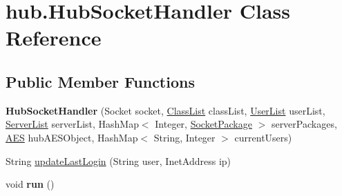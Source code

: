 \hypertarget{classhub_1_1_hub_socket_handler}{
\section{hub.\-Hub\-Socket\-Handler \-Class \-Reference}
\label{classhub_1_1_hub_socket_handler}
}
\subsection*{\-Public \-Member \-Functions}
\begin{DoxyCompactItemize}
\item 
\hypertarget{classhub_1_1_hub_socket_handler_a7895b3b80237dce5f1896317b3e14705}{
{\bfseries \-Hub\-Socket\-Handler} (\-Socket socket, \hyperlink{classstorage_1_1_class_list}{\-Class\-List} class\-List, \hyperlink{classstorage_1_1_user_list}{\-User\-List} user\-List, \hyperlink{classstorage_1_1_server_list}{\-Server\-List} server\-List, \-Hash\-Map$<$ \-Integer, \hyperlink{classutil_1_1_socket_package}{\-Socket\-Package} $>$ server\-Packages, \hyperlink{classsecurity_1_1_a_e_s}{\-A\-E\-S} hub\-A\-E\-S\-Object, \-Hash\-Map$<$ \-String, \-Integer $>$ current\-Users)}
\label{classhub_1_1_hub_socket_handler_a7895b3b80237dce5f1896317b3e14705}

\item 
\-String \hyperlink{classhub_1_1_hub_socket_handler_a865647af5855677d30caf26653e3fe74}{update\-Last\-Login} (\-String user, \-Inet\-Address ip)
\item 
\hypertarget{classhub_1_1_hub_socket_handler_acc644d7386f16a3ea2ac7e284d45883d}{
void {\bfseries run} ()}
\label{classhub_1_1_hub_socket_handler_acc644d7386f16a3ea2ac7e284d45883d}

\end{DoxyCompactItemize}
